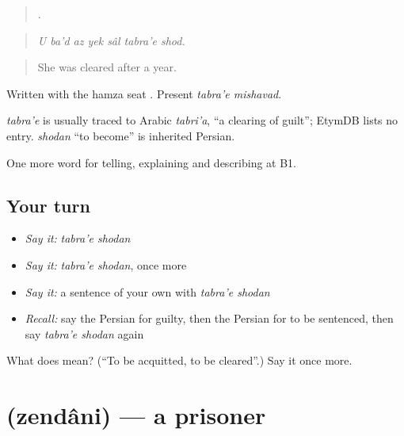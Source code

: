 \begin{quote}
      .
\end{quote}

\begin{quote}
\emph{U ba'd az yek sâl tabra'e shod.}
\end{quote}

\begin{quote}
She was cleared after a year.
\end{quote}

Written with the hamza seat . Present \emph{tabra'e mishavad}.

\begin{cousinweb}
\emph{tabra'e} is usually traced to Arabic \emph{tabri'a}, \textquotedblleft{}a clearing of guilt\textquotedblright{}; EtymDB lists no entry. \emph{shodan} \textquotedblleft{}to become\textquotedblright{} is inherited Persian.
\end{cousinweb}

\begin{grammarlens}[title={What you've built}]
One more word for telling, explaining and describing at B1.
\end{grammarlens}

\subsection*{Your turn}
\begin{itemize}
\raggedright
  \item \emph{Say it:} \emph{tabra'e shodan}
  \item \emph{Say it:} \emph{tabra'e shodan}, once more
  \item \emph{Say it:} a sentence of your own with \emph{tabra'e shodan}
  \item \emph{Recall:} say the Persian for guilty, then the Persian for to be sentenced, then say \emph{tabra'e shodan} again
\end{itemize}

\begin{tcolorbox}[breakable,colback=teal!4,colframe=teal!35!black,title={Before you move on}]
What does   mean? (\textquotedblleft{}To be acquitted, to be cleared\textquotedblright{}.) Say it once more.
\end{tcolorbox}
\section[\texorpdfstring{\fa{زندانی} (zendâni)}{زندانی (zendâni)}]{ (zendâni) — a prisoner}

